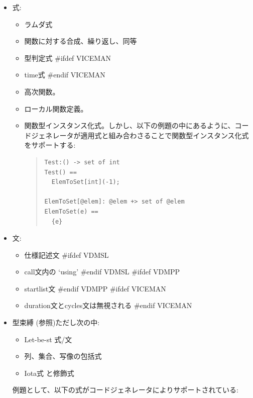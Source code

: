 \documentclass[\pformat,11pt]{jarticle}
\newcommand{\tcg}{コードジェネレータ}
\newcommand{\langmancite}{\cite{LangManPP-CSK}}
\newcommand{\VDM}{VDM++}
\begin{document}
\begin{itemize}

\item 式:

  \begin{itemize}
  \item ラムダ式
  \item 関数に対する合成、繰り返し、同等
  \item 型判定式
#ifdef VICEMAN
  \item time式
#endif VICEMAN
  \item 高次関数。
  \item ローカル関数定義。
  \item 関数型インスタンス化式。しかし、以下の例題の中にあるように、コードジェネレータが適用式と組み合わさることで関数型インスタンス化式をサポートする:

\begin{quote}
\begin{verbatim}
Test:() -> set of int
Test() ==
  ElemToSet[int](-1);

ElemToSet[@elem]: @elem +> set of @elem
ElemToSet(e) ==
  {e}
\end{verbatim}
\end{quote}

  \end{itemize}

\item 文:
  \begin{itemize}
  \item 仕様記述文
#ifdef VDMSL
  \item call文内の `{\sf using}'
#endif VDMSL
#ifdef VDMPP
  \item startlist文
#endif VDMPP
#ifdef VICEMAN
  \item duration文とcycles文は無視される
#endif VICEMAN
  \end{itemize}

\item 型束縛 (\langmancite 参照)ただし次の中:

  \begin{itemize}
  \item Let-be-st 式/文
  \item 列、集合、写像の包括式
  \item Iota式 と修飾式
  \end{itemize}

例題として、以下の式が\tcg によりサポートされている:


\end{itemize}
\end{document}
